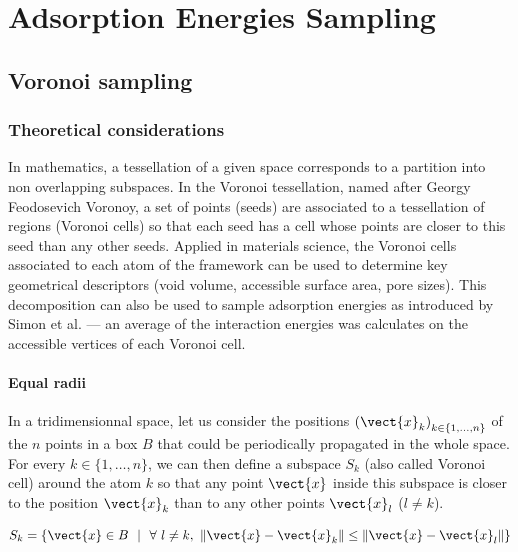 \documentclass[main]{subfiles}
\begin{document}
\chapter{Adsorption Energies Sampling}
\vspace*{-1\baselineskip}

\section{Voronoi sampling}

\subsection{Theoretical considerations}

In mathematics, a tessellation of a given space corresponds to a partition into non overlapping subspaces. In the Voronoi tessellation, named after Georgy Feodosevich Voronoy, a set of points (seeds) are associated to a tessellation of regions (Voronoi cells) so that each seed has a cell whose points are closer to this seed than any other seeds.\cite{Rycroft_2009} Applied in materials science, the Voronoi cells associated to each atom of the framework can be used to determine key geometrical descriptors (void volume, accessible surface area, pore sizes). This decomposition can also be used to sample adsorption energies as introduced by Simon et al. --- an average of the interaction energies was calculates on the accessible vertices of each Voronoi cell.\cite{Simon_2015}

\subsubsection{Equal radii}

In a tridimensionnal space, let us consider the positions ${(\vect{x}_k)}_{k\in\{1,\ldots,n\}}$ of the $n$ points in a box $B$ that could be periodically propagated in the whole space. For every $k\in\{1,\ldots,n\}$, we can then define a subspace $S_{k}$ (also called Voronoi cell) around the atom $k$ so that any point $\vect{x}$ inside this subspace is closer to the position $\vect{x}_k$ than to any other points $\vect{x}_l$ ($l\neq k$). 

\begin{equation}\label{eq:voronoi_partition}
  S_{k} = \left\{\vect{x} \in B\ \ |\ \ \forall\ l\neq k,\ \lVert \vect{x}-\vect{x}_k \rVert \leq \lVert \vect{x}-\vect{x}_l \rVert \right\}
\end{equation}
\end{document}
